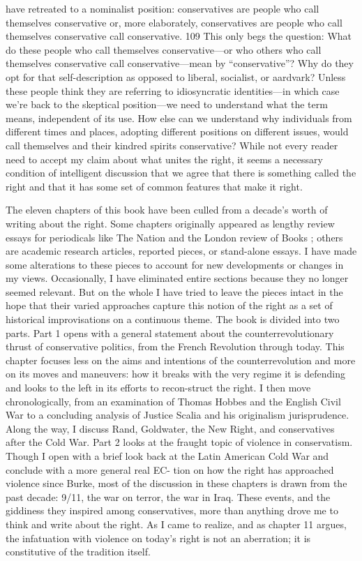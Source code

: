 have retreated to a nominalist position: conservatives are people who call themselves conservative or, more elaborately, conservatives are people who call themselves conservative call conservative. {\color{blue} 109 } This only begs the question: What do these people who call themselves conservative—or who others who call themselves conservative call conservative—mean by “conservative”? Why do they opt for that self-description as opposed to liberal, socialist, or aardvark? Unless these people think they are referring to idiosyncratic identities—in which case we’re back to the skeptical position—we need to understand what the term means, independent of its use. How else can we understand why individuals from different times and places, adopting different positions on different issues, would call themselves and their kindred spirits conservative? While not every reader need to accept my claim about what unites the right, it seems a necessary condition of intelligent discussion that we agree that there is something called the right and that it has some set of common features that make it right.{\par} The eleven chapters of this book have been culled from a decade’s worth of writing about the right. Some chapters originally appeared as lengthy review essays for periodicals like The Nation and the London review of Books ; others are academic research articles, reported pieces, or stand-alone essays. I have made some alterations to these pieces to account for new developments or changes in my views. Occasionally, I have eliminated entire sections because they no longer seemed relevant. But on the whole I have tried to leave the pieces intact in the hope that their varied approaches capture this notion of the right as a set of historical improvisations on a continuous theme. The book is divided into two parts. Part {\color{blue} 1 } opens with a general statement about the counterrevolutionary thrust of conservative politics, from the French Revolution through today. This chapter focuses less on the aims and intentions of the counterrevolution and more on its moves and maneuvers: how it breaks with the very regime it is defending and looks to the left in its efforts to recon-struct the right. I then move chronologically, from an examination of Thomas Hobbes and the English Civil War to a concluding analysis of Justice Scalia and his originalism jurisprudence. Along the way, I discuss Rand, Goldwater, the New Right, and conservatives after the Cold War. Part {\color{blue} 2 } looks at the fraught topic of violence in conservatism. Though I open with a brief look back at the Latin American Cold War and conclude with a more general real EC- tion on how the right has approached violence since Burke, most of the discussion in these chapters is drawn from the past decade: 9/11, the war on terror, the war in Iraq. These events, and the giddiness they inspired among conservatives, more than anything drove me to think and write about the right. As I came to realize, and as chapter {\color{blue} 11 } argues, the infatuation with violence on today’s right is not an aberration; it is constitutive of the tradition itself.{\par}